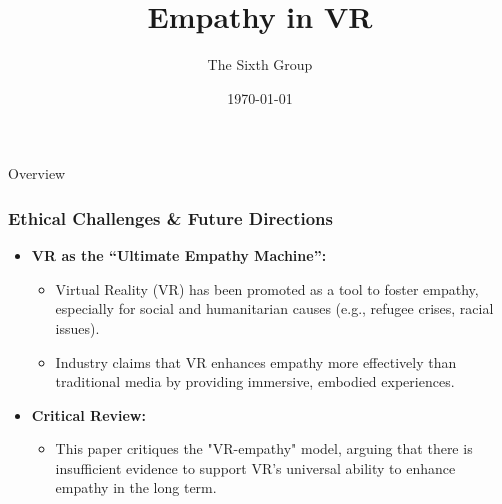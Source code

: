 \documentclass[aspectratio=169,xcolor=dvipsnames]{beamer}
\title{Empathy in VR}
\author{The Sixth Group}
\date{\today} %
\begin{document}
\begin{frame}
    \titlepage
\end{frame}

\begin{frame}{Overview}
    \tableofcontents
\end{frame}





    


\begin{frame}
\frametitle{Ethical Challenges & Future Directions}
\begin{itemize}
    \item \textbf{VR as the “Ultimate Empathy Machine”:}
    \begin{itemize}
        \item Virtual Reality (VR) has been promoted as a tool to foster empathy, especially for social and humanitarian causes (e.g., refugee crises, racial issues).
        \item Industry claims that VR enhances empathy more effectively than traditional media by providing immersive, embodied experiences.
    \end{itemize}
    \item \textbf{Critical Review:}
    \begin{itemize}
        \item This paper critiques the "VR-empathy" model, arguing that there is insufficient evidence to support VR's universal ability to enhance empathy in the long term.
    \end{itemize}
\end{itemize}
\end{frame}
\end{document}
